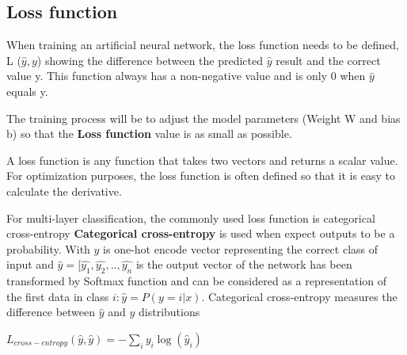 \subsection{Loss function}
When training an artificial neural network, the loss function needs to be defined, L ($\hat{y}, y$) showing the difference between the predicted $\hat{y}$ result and the correct value y. This function always has a non-negative value and is only 0 when $\hat{y}$ equals y.

The training process will be to adjust the model parameters (Weight W and bias b) so that the \textbf{Loss function} value is as small as possible.

A loss function is any function that takes two vectors and returns a scalar value. For optimization purposes, the loss function is often defined so that it is easy to calculate the derivative.

For multi-layer classification, the commonly used loss function is categorical cross-entropy
\textbf{Categorical cross-entropy} is used when expect outputs to be a probability.
With $y$ is one-hot encode vector representing the correct class of input and $\hat{y} = [\hat{y_1},\hat{y_2},..,\hat{y_n}$ is the output vector of the network has been transformed by Softmax function and can be considered as a representation of the first data in class $i: \hat{y} = P(y = i|x)$. Categorical cross-entropy measures the difference between $\hat{y}$ and $y$ distributions
\begin{center}
	$L_{cross-entropy}(\hat{y},\hat{y}) = - \sum\limits_{i}y_{i}\log(\hat{y}_{i})$
\end{center}
